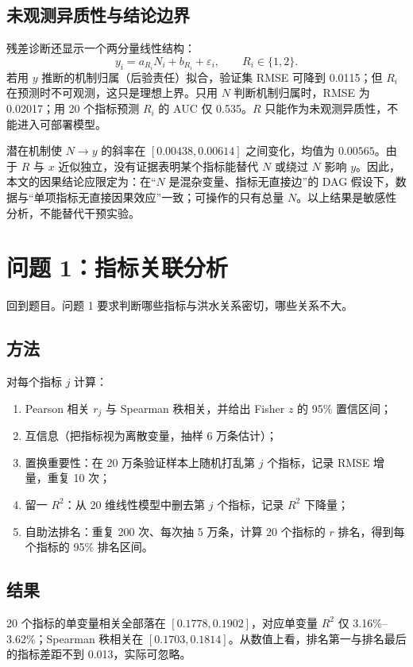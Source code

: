 \documentclass{article}
\begin{document}
\subsection{未观测异质性与结论边界}\label{sec:latent}
残差诊断还显示一个两分量线性结构：
\[
y_i=a_{R_i}N_i+b_{R_i}+\varepsilon_i,\qquad R_i\in\{1,2\}.
\]
若用 \(y\) 推断的机制归属（后验责任）拟合，验证集 RMSE 可降到 0.0115；但 \(R_i\) 在预测时不可观测，这只是理想上界。只用 \(N\) 判断机制归属时，RMSE 为 0.02017；用 20 个指标预测 \(R_i\) 的 AUC 仅 0.535。\(R\) 只能作为未观测异质性，不能进入可部署模型。

潜在机制使 \(N\to y\) 的斜率在 \([0.00438,0.00614]\) 之间变化，均值为 \(0.00565\)。由于 \(R\) 与 \(x\) 近似独立，没有证据表明某个指标能替代 \(N\) 或绕过 \(N\) 影响 \(y\)。因此，本文的因果结论应限定为：在“\(N\) 是混杂变量、指标无直接边”的 DAG 假设下，数据与“单项指标无直接因果效应”一致；可操作的只有总量 \(N\)。以上结果是敏感性分析，不能替代干预实验。

\section{问题 1：指标关联分析}

回到题目。问题 1 要求判断哪些指标与洪水关系密切，哪些关系不大。

\subsection{方法}
对每个指标 $j$ 计算：
\begin{enumerate}
  \item Pearson 相关 $r_j$ 与 Spearman 秩相关，并给出 Fisher $z$ 的 95\% 置信区间；
  \item 互信息（把指标视为离散变量，抽样 6 万条估计）；
  \item 置换重要性：在 20 万条验证样本上随机打乱第 $j$ 个指标，记录 RMSE 增量，重复 10 次；
  \item 留一 $R^2$：从 20 维线性模型中删去第 $j$ 个指标，记录 $R^2$ 下降量；
  \item 自助法排名：重复 200 次、每次抽 5 万条，计算 20 个指标的 $r$ 排名，得到每个指标的 95\% 排名区间。
\end{enumerate}

\subsection{结果}
20 个指标的单变量相关全部落在 $[0.1778,0.1902]$，对应单变量 $R^2$ 仅 3.16\%–3.62\%；Spearman 秩相关在 $[0.1703,0.1814]$。从数值上看，排名第一与排名最后的指标差距不到 0.013，实际可忽略。
\end{document}
